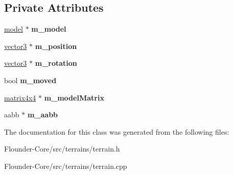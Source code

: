 \subsection*{Private Attributes}
\begin{DoxyCompactItemize}
\item 
\mbox{\label{classflounder_1_1terrain_a7a08ac05b0564ec83e68ae8d44b3ed63}} 
\hyperlink{classflounder_1_1model}{model} $\ast$ {\bfseries m\+\_\+model}
\item 
\mbox{\label{classflounder_1_1terrain_acf835e2a38e668418f8f48e1f0952d4f}} 
\hyperlink{classflounder_1_1vector3}{vector3} $\ast$ {\bfseries m\+\_\+position}
\item 
\mbox{\label{classflounder_1_1terrain_aa6ad0df35db113da24c6f4c9770ed3b0}} 
\hyperlink{classflounder_1_1vector3}{vector3} $\ast$ {\bfseries m\+\_\+rotation}
\item 
\mbox{\label{classflounder_1_1terrain_a371156ee08892ee88f659c302116d608}} 
bool {\bfseries m\+\_\+moved}
\item 
\mbox{\label{classflounder_1_1terrain_a1376a85da92c0cb9f356701413f79091}} 
\hyperlink{classflounder_1_1matrix4x4}{matrix4x4} $\ast$ {\bfseries m\+\_\+model\+Matrix}
\item 
\mbox{\label{classflounder_1_1terrain_a6f19b695b45f2e71e998e8e67f20798b}} 
aabb $\ast$ {\bfseries m\+\_\+aabb}
\end{DoxyCompactItemize}


The documentation for this class was generated from the following files\+:\begin{DoxyCompactItemize}
\item 
Flounder-\/\+Core/src/terrains/terrain.\+h\item 
Flounder-\/\+Core/src/terrains/terrain.\+cpp\end{DoxyCompactItemize}
